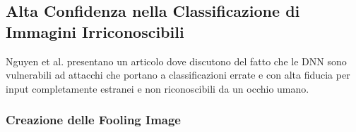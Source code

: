 \subsection{Alta Confidenza nella Classificazione di Immagini Irriconoscibili}
Nguyen et al. \cite{blackbox_fool15} presentano un articolo dove discutono del fatto che le DNN sono vulnerabili ad attacchi che portano a classificazioni errate e con alta fiducia per input completamente estranei e non riconoscibili da un occhio umano.

\subsubsection{Creazione delle Fooling Image}

